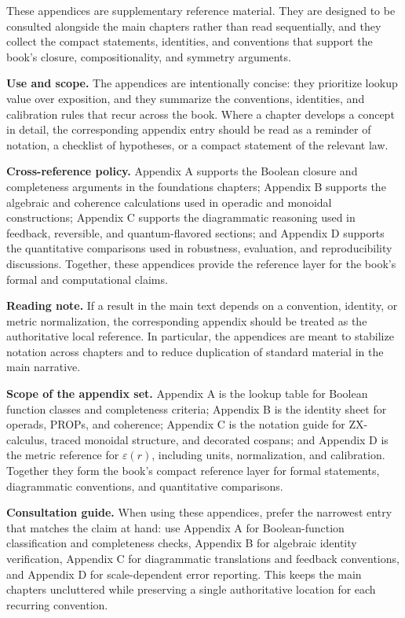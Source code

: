 \documentclass[11pt]{article}
\begin{document}
These appendices are supplementary reference material. They are designed to be consulted alongside the main chapters rather than read sequentially, and they collect the compact statements, identities, and conventions that support the book's closure, compositionality, and symmetry arguments.

\medskip
\noindent\textbf{Use and scope.} The appendices are intentionally concise: they prioritize lookup value over exposition, and they summarize the conventions, identities, and calibration rules that recur across the book. Where a chapter develops a concept in detail, the corresponding appendix entry should be read as a reminder of notation, a checklist of hypotheses, or a compact statement of the relevant law.

\medskip
\noindent\textbf{Cross-reference policy.} Appendix A supports the Boolean closure and completeness arguments in the foundations chapters; Appendix B supports the algebraic and coherence calculations used in operadic and monoidal constructions; Appendix C supports the diagrammatic reasoning used in feedback, reversible, and quantum-flavored sections; and Appendix D supports the quantitative comparisons used in robustness, evaluation, and reproducibility discussions. Together, these appendices provide the reference layer for the book's formal and computational claims.

\medskip
\noindent\textbf{Reading note.} If a result in the main text depends on a convention, identity, or metric normalization, the corresponding appendix should be treated as the authoritative local reference. In particular, the appendices are meant to stabilize notation across chapters and to reduce duplication of standard material in the main narrative.

\medskip
\noindent\textbf{Scope of the appendix set.} Appendix A is the lookup table for Boolean function classes and completeness criteria; Appendix B is the identity sheet for operads, PROPs, and coherence; Appendix C is the notation guide for ZX-calculus, traced monoidal structure, and decorated cospans; and Appendix D is the metric reference for \(\varepsilon(r)\), including units, normalization, and calibration. Together they form the book's compact reference layer for formal statements, diagrammatic conventions, and quantitative comparisons.

\medskip
\noindent\textbf{Consultation guide.} When using these appendices, prefer the narrowest entry that matches the claim at hand: use Appendix A for Boolean-function classification and completeness checks, Appendix B for algebraic identity verification, Appendix C for diagrammatic translations and feedback conventions, and Appendix D for scale-dependent error reporting. This keeps the main chapters uncluttered while preserving a single authoritative location for each recurring convention.
\end{document}
